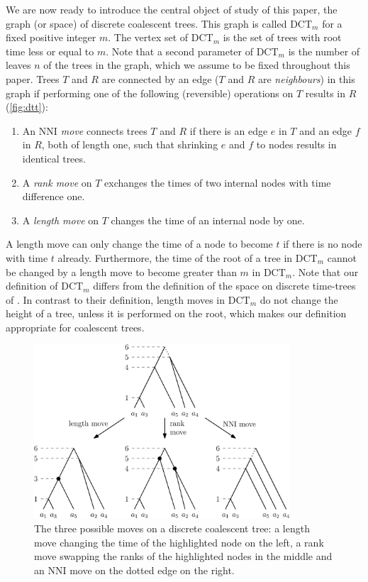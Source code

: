 \documentclass[11pt]{amsart}
\newcommand{\rnni}{\mathrm{RNNI}}
\newcommand{\nni}{\mathrm{NNI}}
\newcommand{\dtt}{\mathrm{DCT}}
\newcommand{\summary}[1]{} %
\begin{document}
\summary{Defining the tree space $\dtt_m$ and $\rnni = \dtt_{n-1}$}
We are now ready to introduce the central object of study of this paper, the graph (or space) of discrete coalescent trees.
This graph is called $\dtt_m$ for a fixed positive integer $m$.
The vertex set of $\dtt_m$ is the set of trees with root time less or equal to $m$.
Note that a second parameter of $\dtt_m$ is the number of leaves $n$ of the trees in the graph, which we assume to be fixed throughout this paper.
Trees $T$ and $R$ are connected by an edge ($T$ and $R$ are \emph{neighbours}) in this graph if performing one of the following (reversible) operations on $T$ results in $R$ (\autoref{fig:dtt}):
\begin{enumerate}
	\item An \emph{$\nni$ move} connects trees $T$ and $R$ if there is an edge $e$ in $T$ and an edge $f$ in $R$, both of length one, such that shrinking $e$ and $f$ to nodes results in identical trees.
	\item A \emph{rank move} on $T$ exchanges the times of two internal nodes with time difference one.
	\item A \emph{length move} on $T$ changes the time of an internal node by one.
\end{enumerate}
A length move can only change the time of a node to become $t$ if there is no node with time $t$ already.
Furthermore, the time of the root of a tree in $\dtt_m$ cannot be changed by a length move to become greater than $m$ in $\dtt_m$.
Note that our definition of $\dtt_m$ differs from the definition of the space on discrete time-trees of \textcite{Gavryushkin2018-ol}.
In contrast to their definition, length moves in $\dtt_m$ do not change the height of a tree, unless it is performed on the root, which makes our definition appropriate for coalescent trees.

\begin{figure}[ht]
	\includegraphics[width=0.85\textwidth]{dtt.eps}
	\caption{The three possible moves on a discrete coalescent tree: a length move changing the time of the highlighted node on the left, a rank move swapping the ranks of the highlighted nodes 	in the middle and an $\nni$ move on the dotted edge on the right.}
	\label{fig:dtt}
\end{figure}
\end{document}

